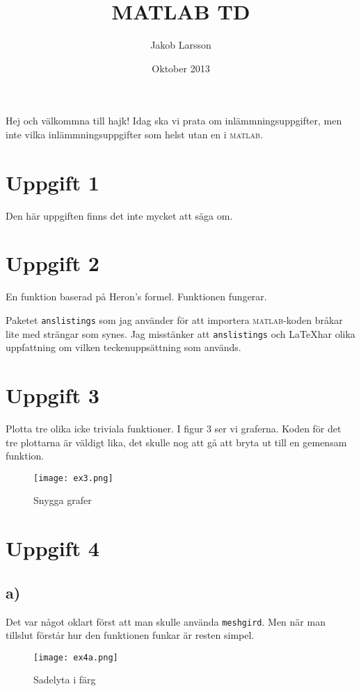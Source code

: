 \documentclass[a4paper,11pt]{article}
\begin{document}
    \title{\textsc{MATLAB} TD}
    \author{Jakob Larsson}
    \date{Oktober 2013}
    \maketitle{}

    Hej och välkommna till hajk! Idag ska vi prata om inlämmningsuppgifter,
    men inte vilka inlämmningsuppgifter som helst utan en i \textsc{matlab}.

    \section*{Uppgift 1}
    Den här uppgiften finns det inte mycket att säga om.

    \section*{Uppgift 2}
    En funktion baserad  på Heron's formel.
    Funktionen fungerar.

    Paketet \verb+anslistings+ som jag använder för att importera
    \textsc{matlab}-koden
    bråkar lite med strängar som synes. Jag misstänker att \verb+anslistings+
    och \LaTeX har olika uppfattning om vilken teckenuppsättning som används.

    \section*{Uppgift 3}
    Plotta tre olika icke triviala funktioner. I figur 3 ser vi graferna.
    Koden för det tre plottarna är väldigt lika, det skulle nog att gå att bryta
    ut till en gemensam funktion.
    \begin{figure}
        \texttt{[image: ex3.png]}
        \caption{Snygga grafer}
    \end{figure}

    \section*{Uppgift 4}
    \subsection*{a)}
    Det var något oklart först att man skulle använda \verb=meshgird=.
    Men när man tillslut förstår hur den funktionen funkar är resten simpel.
    \begin{figure}
        \texttt{[image: ex4a.png]}
        \caption{Sadelyta i färg}
    \end{figure}
\end{document}
